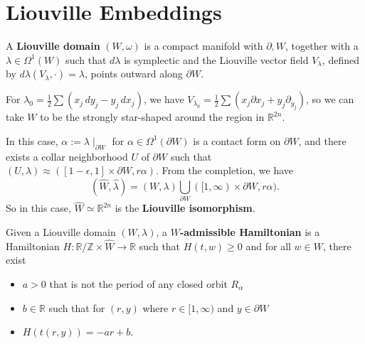 \section{Liouville Embeddings}

\begin{definition}

A \textbf{Liouville domain} $(W, \omega)$ is a compact manifold with $\partial, W$, together with a $\lambda \in \Omega^1(W)$ such that $d\lambda$ is symplectic and the Liouville vector field $V_\lambda$, defined by $d\lambda(V_\lambda, \cdot)=\lambda$, points outward along $\partial W$.

\end{definition}

\begin{example}

For $\lambda_0 = \frac{1}{2} \sum (x_j \,dy_j - y_j \,dx_j)$, we have $V_{\lambda_0} = \frac{1}{2}\sum (x_j \partial{x_j}+y_j \partial_{y_j})$, so we can take $W$ to be the strongly star-shaped around the region in $\mathbb{R}^{2n}$.

In this case, $\alpha:= \lambda\mid_{\partial W}$ for $\alpha \in \Omega^1(\partial W)$ is a contact form on $\partial W$, and there exists a collar neighborhood $U$ of $\partial W$ such that $(U, \lambda) \approx ([1-\epsilon, 1]\times \partial W, r\alpha)$. From the completion, we have
\[
\left(\hat{W}, \hat{\lambda}\right)=(W,\lambda) \bigcup_{\partial W} ([1, \infty)\times \partial W,  r\alpha).
\]
So in this case, $\hat{W}\simeq \mathbb{R}^{2n}$ is the \textbf{Liouville isomorphism}.

\end{example}

\begin{definition}

Given a Liouville domain $(W,\lambda)$, a \textbf{$W$-admissible Hamiltonian} is a Hamiltonian $H: \mathbb{R}/\mathbb{Z} \times \hat{W} \to \mathbb{R}$ such that $H(t,w)\ge 0$ and for all $w\in W$, there exist
\begin{itemize}
\item $a>0$ that is not the period of any closed orbit $R_\alpha$
\item $b\in \mathbb{R}$ such that for $(r, y)$ where $r\in [1,\infty)$ and $y\in \partial W$
\item $H(t(r,y))=-ar+b$.
\end{itemize}

\end{definition}

